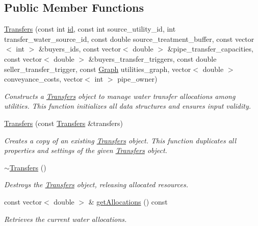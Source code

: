 \subsection*{Public Member Functions}
\begin{DoxyCompactItemize}
\item 
\mbox{\hyperlink{classTransfers_ae6abf817349382b66abc9cc3f45193a1}{Transfers}} (const int \mbox{\hyperlink{classDroughtMitigationPolicy_abf3ed19ed98e0d74dc9ae24094be640b}{id}}, const int source\+\_\+utility\+\_\+id, int transfer\+\_\+water\+\_\+source\+\_\+id, const double source\+\_\+treatment\+\_\+buffer, const vector$<$ int $>$ \&buyers\+\_\+ids, const vector$<$ double $>$ \&pipe\+\_\+transfer\+\_\+capacities, const vector$<$ double $>$ \&buyers\+\_\+transfer\+\_\+triggers, const double seller\+\_\+transfer\+\_\+trigger, const \mbox{\hyperlink{classGraph}{Graph}} utilities\+\_\+graph, vector$<$ double $>$ conveyance\+\_\+costs, vector$<$ int $>$ pipe\+\_\+owner)
\begin{DoxyCompactList}\small\item\em Constructs a \mbox{\hyperlink{classTransfers}{Transfers}} object to manage water transfer allocations among utilities. This function initializes all data structures and ensures input validity. \end{DoxyCompactList}\item 
\mbox{\hyperlink{classTransfers_af88f7908692240eec9f3179128c6f343}{Transfers}} (const \mbox{\hyperlink{classTransfers}{Transfers}} \&transfers)
\begin{DoxyCompactList}\small\item\em Creates a copy of an existing \mbox{\hyperlink{classTransfers}{Transfers}} object. This function duplicates all properties and settings of the given \mbox{\hyperlink{classTransfers}{Transfers}} object. \end{DoxyCompactList}\item 
\mbox{\hyperlink{classTransfers_a5dfeafe7a9b9a446b1ab746b65ef3b4b}{$\sim$\+Transfers}} ()
\begin{DoxyCompactList}\small\item\em Destroys the \mbox{\hyperlink{classTransfers}{Transfers}} object, releasing allocated resources. \end{DoxyCompactList}\item 
const vector$<$ double $>$ \& \mbox{\hyperlink{classTransfers_abb5bd2978727424dc524c401dca0cbaf}{get\+Allocations}} () const
\begin{DoxyCompactList}\small\item\em Retrieves the current water allocations. \end{DoxyCompactList}\item 

\end{DoxyCompactItemize}
